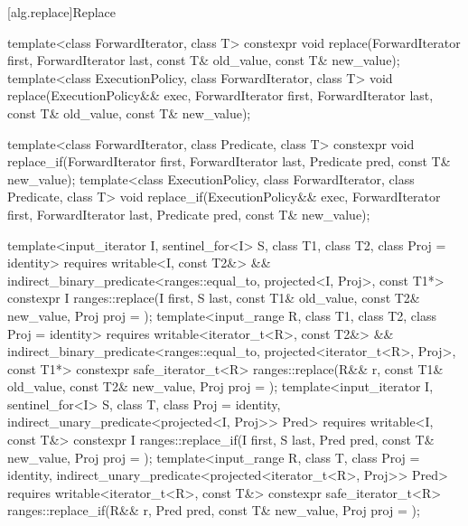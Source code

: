 [alg.replace]{Replace}

%
%
\begin{itemdecl}
template<class ForwardIterator, class T>
  constexpr void replace(ForwardIterator first, ForwardIterator last,
                         const T& old_value, const T& new_value);
template<class ExecutionPolicy, class ForwardIterator, class T>
  void replace(ExecutionPolicy&& exec,
               ForwardIterator first, ForwardIterator last,
               const T& old_value, const T& new_value);

template<class ForwardIterator, class Predicate, class T>
  constexpr void replace_if(ForwardIterator first, ForwardIterator last,
                            Predicate pred, const T& new_value);
template<class ExecutionPolicy, class ForwardIterator, class Predicate, class T>
  void replace_if(ExecutionPolicy&& exec,
                  ForwardIterator first, ForwardIterator last,
                  Predicate pred, const T& new_value);

template<input_iterator I, sentinel_for<I> S, class T1, class T2, class Proj = identity>
  requires writable<I, const T2&> &&
           indirect_binary_predicate<ranges::equal_to, projected<I, Proj>, const T1*>
  constexpr I
    ranges::replace(I first, S last, const T1& old_value, const T2& new_value, Proj proj = {});
template<input_range R, class T1, class T2, class Proj = identity>
  requires writable<iterator_t<R>, const T2&> &&
           indirect_binary_predicate<ranges::equal_to, projected<iterator_t<R>, Proj>, const T1*>
  constexpr safe_iterator_t<R>
    ranges::replace(R&& r, const T1& old_value, const T2& new_value, Proj proj = {});
template<input_iterator I, sentinel_for<I> S, class T, class Proj = identity,
         indirect_unary_predicate<projected<I, Proj>> Pred>
  requires writable<I, const T&>
  constexpr I ranges::replace_if(I first, S last, Pred pred, const T& new_value, Proj proj = {});
template<input_range R, class T, class Proj = identity,
         indirect_unary_predicate<projected<iterator_t<R>, Proj>> Pred>
  requires writable<iterator_t<R>, const T&>
  constexpr safe_iterator_t<R>
    ranges::replace_if(R&& r, Pred pred, const T& new_value, Proj proj = {});
\end{itemdecl}


